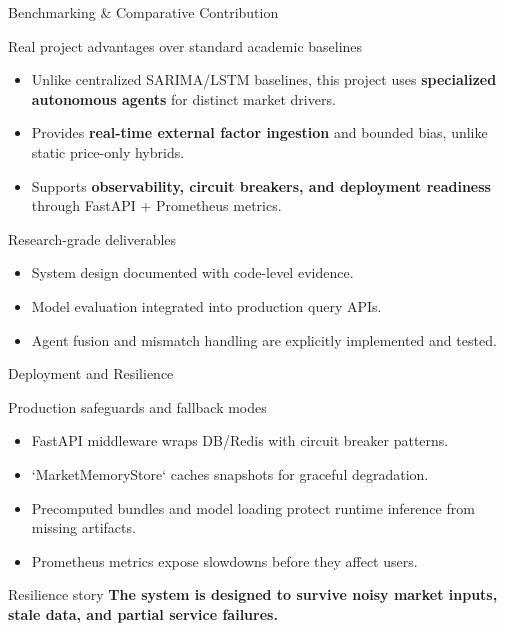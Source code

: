 \documentclass{beamer}
\begin{document}
\begin{frame}{Benchmarking \& Comparative Contribution}
\begin{infocard}{Real project advantages over standard academic baselines}
  \begin{itemize}
    \item Unlike centralized SARIMA/LSTM baselines, this project uses \textbf{specialized autonomous agents} for distinct market drivers.
    \item Provides \textbf{real-time external factor ingestion} and bounded bias, unlike static price-only hybrids.
    \item Supports \textbf{observability, circuit breakers, and deployment readiness} through FastAPI + Prometheus metrics.
  \end{itemize}
\end{infocard}

\vspace{6pt}
\begin{successcard}{Research-grade deliverables}
  \begin{itemize}
    \item System design documented with code-level evidence.
    \item Model evaluation integrated into production query APIs.
    \item Agent fusion and mismatch handling are explicitly implemented and tested.
  \end{itemize}
\end{successcard}
\end{frame}

\begin{frame}{Deployment and Resilience}
\begin{infocard}{Production safeguards and fallback modes}
  \begin{itemize}
    \item FastAPI middleware wraps DB/Redis with circuit breaker patterns.
    \item `MarketMemoryStore` caches snapshots for graceful degradation.
    \item Precomputed bundles and model loading protect runtime inference from missing artifacts.
    \item Prometheus metrics expose slowdowns before they affect users.
  \end{itemize}
\end{infocard}

\begin{alertcard}{Resilience story}
  \textbf{The system is designed to survive noisy market inputs, stale data, and partial service failures.}
\end{alertcard}
\end{frame}
\end{document}
